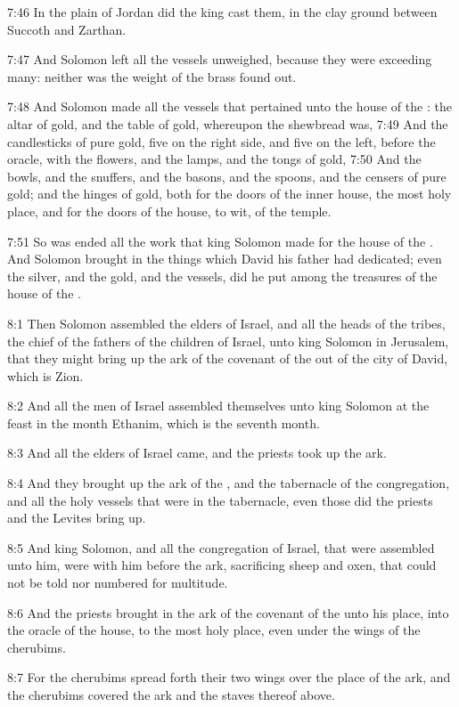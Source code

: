 7:46 In the plain of Jordan did the king cast them, in the clay ground
between Succoth and Zarthan.

7:47 And Solomon left all the vessels unweighed, because they were
exceeding many: neither was the weight of the brass found out.

7:48 And Solomon made all the vessels that pertained unto the house of
the \LORD: the altar of gold, and the table of gold, whereupon the
shewbread was, 7:49 And the candlesticks of pure gold, five on the
right side, and five on the left, before the oracle, with the flowers,
and the lamps, and the tongs of gold, 7:50 And the bowls, and the
snuffers, and the basons, and the spoons, and the censers of pure
gold; and the hinges of gold, both for the doors of the inner house,
the most holy place, and for the doors of the house, to wit, of the
temple.

7:51 So was ended all the work that king Solomon made for the house of
the \LORD. And Solomon brought in the things which David his father had
dedicated; even the silver, and the gold, and the vessels, did he put
among the treasures of the house of the \LORD.

8:1 Then Solomon assembled the elders of Israel, and all the heads of
the tribes, the chief of the fathers of the children of Israel, unto
king Solomon in Jerusalem, that they might bring up the ark of the
covenant of the \LORD out of the city of David, which is Zion.

8:2 And all the men of Israel assembled themselves unto king Solomon
at the feast in the month Ethanim, which is the seventh month.

8:3 And all the elders of Israel came, and the priests took up the
ark.

8:4 And they brought up the ark of the \LORD, and the tabernacle of the
congregation, and all the holy vessels that were in the tabernacle,
even those did the priests and the Levites bring up.

8:5 And king Solomon, and all the congregation of Israel, that were
assembled unto him, were with him before the ark, sacrificing sheep
and oxen, that could not be told nor numbered for multitude.

8:6 And the priests brought in the ark of the covenant of the \LORD
unto his place, into the oracle of the house, to the most holy place,
even under the wings of the cherubims.

8:7 For the cherubims spread forth their two wings over the place of
the ark, and the cherubims covered the ark and the staves thereof
above.

